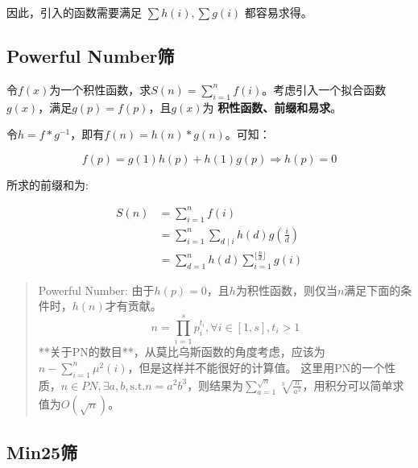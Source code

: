 因此，引入的函数需要满足 $\sum{h(i)},\sum{g(i)}$ 都容易求得。

\subsection{Powerful Number筛}
令$f(x)$为一个积性函数，求$S(n)=\sum_{i=1}^{n}f(i)$。考虑引入一个拟合函数$g(x)$，满足$g(p)=f(p)$，且$g(x)$为 \textbf{积性函数、前缀和易求}。

令$h=f*g^{-1}$，即有$f(n)=h(n)*g(n)$。可知：

$$f(p)=g(1)h(p)+h(1)g(p) \Rightarrow h(p)=0$$

所求的前缀和为:

$$
\begin{aligned}
S(n) 
&= \sum_{i=1}^{n}f(i) \\
&= \sum_{i=1}^{n}\sum_{d\mid i}h(d)g(\frac{i}{d}) \\
&= \sum_{d=1}^{n}h(d)\sum_{i=1}^{\lfloor\frac{n}{d}\rfloor}g(i)
\end{aligned}
$$

\begin{quotation}
Powerful Number: 由于$h(p)=0$，且$h$为积性函数，则仅当$n$满足下面的条件时，$h(n)$才有贡献。
$$n=\prod_{i=1}^{s} p_i^{t_i},\forall i \in [1, s],t_i>1$$
**关于PN的数目**，从莫比乌斯函数的角度考虑，应该为$n-\sum_{i=1}^{n}\mu^2(i)$，但是这样并不能很好的计算值。
这里用PN的一个性质，$n\in PN,\exists a,b, \mathrm{s.t. } n=a^2b^3$，则结果为$\sum_{a=1}^{\sqrt n}\sqrt[3]{\frac{n}{a^2}}$，用积分可以简单求值为$O(\sqrt n)$。
\end{quotation}  
  
\subsection{Min25筛}